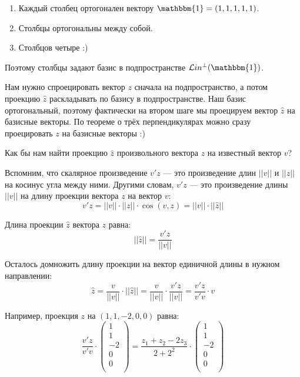 \documentclass[11pt,russian,]{article}
\newcommand{\1}{\mathbbm{1}}
\newcommand{\Lin}{\mathcal{L}in}
\newcommand{\Linp}{\Lin^{\perp}}
\begin{document}
\begin{enumerate}
\def\labelenumi{\arabic{enumi}.}
\item
  Каждый столбец ортогонален вектору \(\1 = (1, 1, 1, 1, 1)\).
\item
  Столбцы ортогональны между собой.
\item
  Столбцов четыре :)
\end{enumerate}

Поэтому столбцы задают базис в подпространстве \(\Linp (\1)\).

Нам нужно спроецировать вектор \(z\) сначала на подпространство, а потом
проекцию \(\hat z\) раскладывать по базису в подпространстве. Наш базис
ортогональный, поэтому фактически на втором шаге мы проецируем вектор
\(\hat z\) на базисные векторы. По теореме о трёх перпендикулярах можно
сразу проецировать \(z\) на базисные векторы :)

Как бы нам найти проекцию \(\hat z\) произвольного вектора \(z\) на
известный вектор \(v\)?

Вспомним, что скалярное произведение \(v'z\) --- это произведение длин
\(||v||\) и \(||z||\) на косинус угла между ними. Другими словам,
\(v'z\) --- это произведение длины \(||v||\) на длину проекции вектора
\(z\) на вектор \(v\): \[
v'z = ||v||\cdot ||z||\cdot \cos(v, z) = ||v||\cdot ||\hat z||
\]

Длина проекции \(\hat z\) вектора \(z\) равна: \[
||\hat z|| = \frac{v'z}{||v||}
\]

Осталось домножить длину проекции на вектор единичной длины в нужном
направлении: \[
\hat z = \frac{v}{||v||} \cdot ||\hat z|| = \frac{v}{||v||} \cdot \frac{v'z}{||v||} =  \frac{v'z}{v'v} \cdot v
\]

Например, проекция \(z\) на \((1, 1, -2, 0, 0)\) равна: \[
\frac{v'z}{v'v} \cdot \begin{pmatrix}
1 \\
1 \\
-2 \\
0 \\
0 \\
\end{pmatrix} = 
\frac{z_1 + z_2 - 2z_3}{2+2^2} \cdot \begin{pmatrix}
1 \\
1 \\
-2 \\
0 \\
0 \\
\end{pmatrix}
\]
\end{document}

